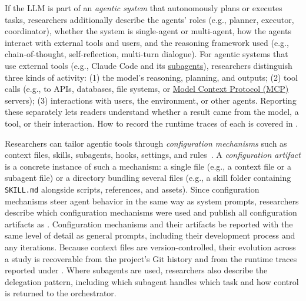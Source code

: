 If the LLM is part of an \emph{agentic system} that autonomously plans or executes tasks, researchers \must additionally describe the agents' roles (e.g., planner, executor, coordinator), whether the system is single-agent or multi-agent, how the agents interact with external tools and users, and the reasoning framework used (e.g., chain-of-thought, self-reflection, multi-turn dialogue).
For agentic systems that use external tools (e.g., Claude Code and its \href{https://code.claude.com/docs/en/sub-agents}{subagents}), researchers \must distinguish three kinds of activity: (1) the model's reasoning, planning, and outputs; (2) tool calls (e.g., to APIs, databases, file systems, or \href{https://modelcontextprotocol.io/}{Model Context Protocol (MCP)} servers); (3) interactions with users, the environment, or other agents.
Reporting these separately lets readers understand whether a result came from the model, a tool, or their interaction. How to record the runtime traces of each is covered in \traces.

Researchers can tailor agentic tools through \emph{configuration mechanisms} such as context files, skills, subagents, hooks, settings, and rules~\cite{galster2026configuring}.
A \emph{configuration artifact} is a concrete instance of such a mechanism: a single file (e.g., a context file or a subagent file) or a directory bundling several files (e.g., a skill folder containing \texttt{SKILL.md} alongside scripts, references, and assets).
Since configuration mechanisms steer agent behavior in the same way as system prompts, researchers \must describe which configuration mechanisms were used and \should publish all configuration artifacts as \supplementarymaterial.
Configuration mechanisms and their artifacts \must be reported with the same level of detail as general prompts, including their development process and any iterations.
Because context files are version-controlled, their evolution across a study is recoverable from the project's Git history and from the runtime traces reported under \traces.
Where subagents are used, researchers \should also describe the delegation pattern, including which subagent handles which task and how control is returned to the orchestrator.

